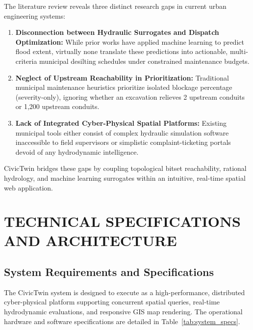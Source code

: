 \documentclass[12pt,a4paper]{report}
\begin{document}
The literature review reveals three distinct research gaps in current urban engineering systems:
\begin{enumerate}
    \item \textbf{Disconnection between Hydraulic Surrogates and Dispatch Optimization:} While prior works have applied machine learning to predict flood extent, virtually none translate these predictions into actionable, multi-criteria municipal desilting schedules under constrained maintenance budgets.
    \item \textbf{Neglect of Upstream Reachability in Prioritization:} Traditional municipal maintenance heuristics prioritize isolated blockage percentage (severity-only), ignoring whether an excavation relieves 2 upstream conduits or 1,200 upstream conduits.
    \item \textbf{Lack of Integrated Cyber-Physical Spatial Platforms:} Existing municipal tools either consist of complex hydraulic simulation software inaccessible to field supervisors or simplistic complaint-ticketing portals devoid of any hydrodynamic intelligence.
\end{enumerate}

CivicTwin bridges these gaps by coupling topological bitset reachability, rational hydrology, and machine learning surrogates within an intuitive, real-time spatial web application.



\chapter{TECHNICAL SPECIFICATIONS AND ARCHITECTURE}

\section{System Requirements and Specifications}
The CivicTwin system is designed to execute as a high-performance, distributed cyber-physical platform supporting concurrent spatial queries, real-time hydrodynamic evaluations, and responsive GIS map rendering. The operational hardware and software specifications are detailed in Table~\ref{tab:system_specs}.
\end{document}
